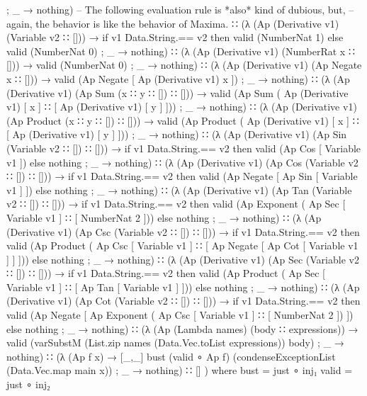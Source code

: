 \documentclass{report}
\begin{document}
\begin{code}
{           ; _ → nothing})
      -- The following evaluation rule is *also* kind of dubious, but,
      -- again, the behavior is like the behavior of Maxima.
      ∷ (λ { (Ap (Derivative v1) (Variable v2 ∷ [])) →
             if v1 Data.String.== v2
               then valid (NumberNat 1)
               else valid (NumberNat 0)
           ; _ → nothing})
      ∷ (λ { (Ap (Derivative v1) (NumberRat x ∷ [])) →
             valid (NumberNat 0)
           ; _ → nothing})
      ∷ (λ { (Ap (Derivative v1) (Ap Negate x ∷ [])) →
             valid (Ap Negate [ Ap (Derivative v1) x ])
           ; _ → nothing})
      ∷ (λ { (Ap (Derivative v1) (Ap Sum (x ∷ y ∷ []) ∷ [])) →
             valid (Ap Sum ( Ap (Derivative v1) [ x ]
                           ∷ [ Ap (Derivative v1) [ y ] ]))
           ; _ → nothing})
      ∷ (λ { (Ap (Derivative v1) (Ap Product (x ∷ y ∷ []) ∷ [])) →
             valid (Ap Product ( Ap (Derivative v1) [ x ]
                               ∷ [ Ap (Derivative v1) [ y ] ]))
           ; _ → nothing})
      ∷ (λ { (Ap (Derivative v1) (Ap Sin (Variable v2 ∷ []) ∷ [])) →
             if v1 Data.String.== v2
               then valid (Ap Cos [ Variable v1 ])
               else nothing
           ; _ → nothing})
      ∷ (λ { (Ap (Derivative v1) (Ap Cos (Variable v2 ∷ []) ∷ [])) →
             if v1 Data.String.== v2
               then valid (Ap Negate [ Ap Sin [ Variable v1 ] ])
               else nothing
           ; _ → nothing})
      ∷ (λ { (Ap (Derivative v1) (Ap Tan (Variable v2 ∷ []) ∷ [])) →
             if v1 Data.String.== v2
               then valid (Ap Exponent ( Ap Sec [ Variable v1 ] ∷ [ NumberNat 2 ]))
               else nothing
           ; _ → nothing})
      ∷ (λ { (Ap (Derivative v1) (Ap Csc (Variable v2 ∷ []) ∷ [])) →
             if v1 Data.String.== v2
               then valid (Ap Product
                              ( Ap Csc [ Variable v1 ]
                              ∷ [ Ap Negate [ Ap Cot [ Variable v1 ] ] ]))
               else nothing
           ; _ → nothing})
      ∷ (λ { (Ap (Derivative v1) (Ap Sec (Variable v2 ∷ []) ∷ [])) →
             if v1 Data.String.== v2
               then valid (Ap Product
                              ( Ap Sec [ Variable v1 ]
                              ∷ [ Ap Tan [ Variable v1 ] ]))
               else nothing
           ; _ → nothing})
      ∷ (λ { (Ap (Derivative v1) (Ap Cot (Variable v2 ∷ []) ∷ [])) →
             if v1 Data.String.== v2
               then valid (Ap Negate
                              [ Ap Exponent
                                   ( Ap Csc [ Variable v1 ]
                                   ∷ [ NumberNat 2 ]) ])
               else nothing
           ; _ → nothing})
      ∷ (λ { (Ap (Lambda names) (body ∷ expressions)) →
             valid (varSubstM (List.zip names (Data.Vec.toList expressions)) body)
           ; _ → nothing})
      ∷ (λ { (Ap f x) → [_,_] bust
                              (valid ∘ Ap f)
                              (condenseExceptionList (Data.Vec.map main x))
           ; _ → nothing})
      ∷ []
      )
      where
      bust = just ∘ inj₁
      valid = just ∘ inj₂


\end{code}
\end{document}
